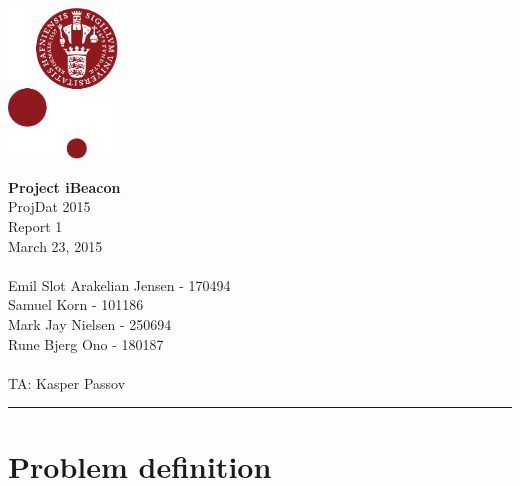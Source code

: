 \documentclass[12pt]{article}
\begin{document}
\begin{minipage}[b]{1.0\linewidth} 
\includegraphics[height=40mm]{KULogo}

\vspace*{-30ex}
\begin{center}
    {\Large \bf Project iBeacon} \vspace*{1ex} \\
    {\large ProjDat 2015} \vspace*{1ex} \\
    {\large Report 1} \vspace*{1ex} \\
    {\large March 23, 2015} \vspace*{1ex} \\
    \ \\
    
    {\large Emil Slot Arakelian Jensen - 170494} \vspace*{1ex}\\
	{\large Samuel Korn - 101186} \vspace*{1ex}\\
	{\large Mark Jay Nielsen - 250694} \vspace*{1ex}\\
	{\large Rune Bjerg Ono - 180187} \vspace*{1ex}\\
	\ \\
	
	{\large TA: Kasper Passov} \vspace*{1ex} \\
\end{center}

\vspace*{-3pt}
{\color{KU-red}\hrule}
\end{minipage}


\newpage

\tableofcontents










\newpage
\section{Problem definition}
\end{document}
